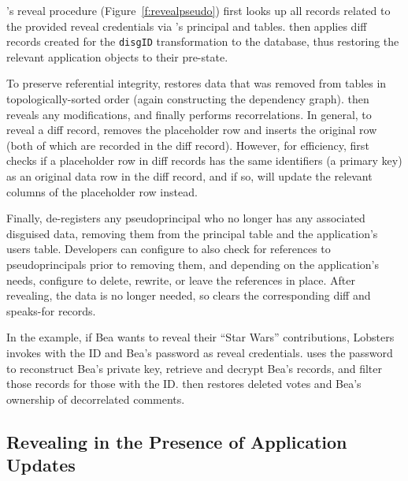 \sys's reveal procedure (Figure~\ref{f:revealpseudo}) first looks up all \xx
records related to the provided reveal credentials via \sys's principal and \xx
tables.
%
\sys then applies diff records created for the \verb+disgID+ \xx transformation
to the database, thus restoring the relevant
application objects to their pre-\xxed state.

%
To preserve referential integrity, \sys restores
\xxed data that was removed from tables in topologically-sorted order (again
constructing the dependency graph).
%
\sys then reveals any modifications, and finally performs recorrelations. 
%
In general, to reveal a diff record, \sys removes the placeholder row
and inserts the original row (both of which are recorded in the diff record).
%
However, for efficiency, \sys first checks if a placeholder row in diff records
has the same identifiers (\eg a primary key) as an original data row in the diff
record, and if so, will update the relevant columns of the placeholder row instead.
%

%
Finally, \sys de-registers any pseudoprincipal who no longer has any associated
disguised data, removing them from the principal table and the application's
users table.
%
Developers can configure \sys to also check for references to pseudoprincipals
prior to removing them, and depending on the application's needs, configure \sys
to delete, rewrite, or leave the references in place.
%
After revealing, the \xxed data is no longer needed, so \sys clears the
corresponding diff and speaks-for records.
%

%
In the example, if Bea wants to reveal their ``Star Wars'' contributions,
Lobsters invokes \sys with the \xx ID and Bea's password as reveal credentials.
%
\sys uses the password to reconstruct Bea's private key, retrieve and decrypt
Bea's records, and filter those records for those with the \xx ID.
%
\sys then restores deleted votes and Bea's ownership of
decorrelated comments.
%

\subsection{Revealing in the Presence of Application Updates}


